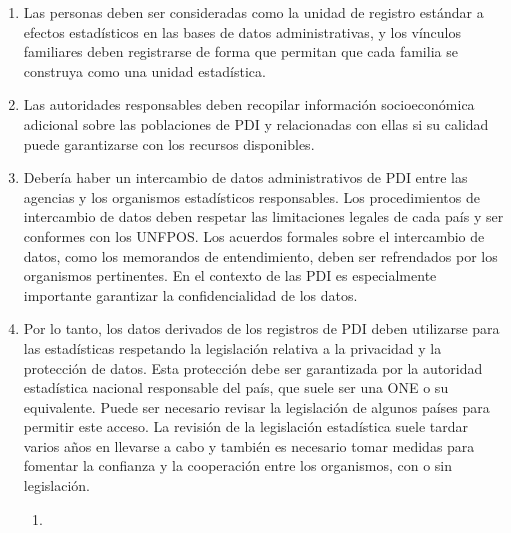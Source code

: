 \documentclass[
]{book}
\begin{document}
\begin{enumerate}
\item
  Las personas deben ser consideradas como la unidad de registro estándar a efectos estadísticos en las bases de datos administrativas, y los vínculos familiares deben registrarse de forma que permitan que cada familia se construya como una unidad estadística.
\item
  Las autoridades responsables deben recopilar información socioeconómica adicional sobre las poblaciones de PDI y relacionadas con ellas si su calidad puede garantizarse con los recursos disponibles.
\item
  Debería haber un intercambio de datos administrativos de PDI entre las agencias y los organismos estadísticos responsables. Los procedimientos de intercambio de datos deben respetar las limitaciones legales de cada país y ser conformes con los UNFPOS. Los acuerdos formales sobre el intercambio de datos, como los memorandos de entendimiento, deben ser refrendados por los organismos pertinentes. En el contexto de las PDI es especialmente importante garantizar la confidencialidad de los datos.
\item
  Por lo tanto, los datos derivados de los registros de PDI deben utilizarse para las estadísticas respetando la legislación relativa a la privacidad y la protección de datos. Esta protección debe ser garantizada por la autoridad estadística nacional responsable del país, que suele ser una ONE o su equivalente. Puede ser necesario revisar la legislación de algunos países para permitir este acceso. La revisión de la legislación estadística suele tardar varios años en llevarse a cabo y también es necesario tomar medidas para fomentar la confianza y la cooperación entre los organismos, con o sin legislación.

  \begin{enumerate}
  \def\labelenumii{\arabic{enumii}.}
  \item ~
    \hypertarget{fuentes-de-datos-alternativas}{%
}
\end{enumerate}
\end{enumerate}
\end{document}
